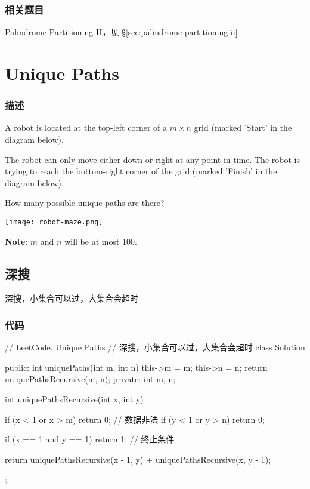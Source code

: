\subsubsection{相关题目}

\begindot
\item Palindrome Partitioning II，见 \S \ref{sec:palindrome-partitioning-ii}
\myenddot


\section{Unique Paths} %
\label{sec:unique-paths}


\subsubsection{描述}
A robot is located at the top-left corner of a $m \times n$ grid (marked 'Start' in the diagram below).

The robot can only move either down or right at any point in time. The robot is trying to reach the bottom-right corner of the grid (marked 'Finish' in the diagram below).

How many possible unique paths are there?

\begin{center}
\texttt{[image: robot-maze.png]}\\
\label{fig:unique-paths}
\end{center}

\textbf{Note}: $m$ and $n$ will be at most 100.


\subsection{深搜}
深搜，小集合可以过，大集合会超时

\subsubsection{代码}
\begin{Code}
// LeetCode, Unique Paths
// 深搜，小集合可以过，大集合会超时
class Solution {
public:
    int uniquePaths(int m, int n) {
        this->m = m;
        this->n = n;
        return uniquePathsRecursive(m, n);
    }
private:
    int m, n;

    int uniquePathsRecursive(int x, int y) {
        if (x < 1 or x > m) return 0; // 数据非法
        if (y < 1 or y > n) return 0;

        if (x == 1 and y == 1) return 1; // 终止条件

        return uniquePathsRecursive(x - 1, y) + uniquePathsRecursive(x, y - 1);
    }
};
\end{Code}


